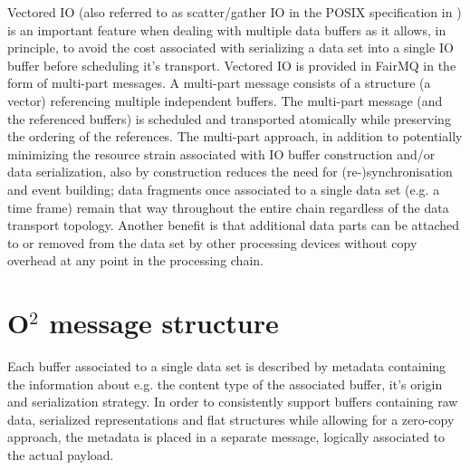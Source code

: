 \documentclass[a4paper,twoside]{article}
\newcommand\comment[1]{\color{red}{ #1 }\color{black}}
\def\O2{O$^2$}
\begin{document}
Vectored IO (also referred to as scatter/gather IO in the POSIX specification in \cite{posix}) is an important feature when dealing with multiple data buffers as it allows, in principle, to avoid the cost associated with serializing a data set into a single IO buffer before scheduling it's transport.
Vectored IO is provided in FairMQ in the form of multi-part messages. A multi-part message consists of a structure (a vector) referencing multiple independent buffers. The multi-part message (and the referenced buffers) is scheduled and transported atomically while preserving the ordering of the references.
The multi-part approach, in addition to potentially minimizing the resource strain associated with IO buffer construction and/or data serialization, also by construction reduces the need for (re-)synchronisation and event building; data fragments once associated to a single data set (e.g. a time frame) remain that way throughout the entire chain regardless of the data transport topology. Another benefit is that additional data parts can be attached to or removed from the data set by other processing devices without copy overhead at any point in the processing chain.

\comment{
In the case zero-copy vectored IO is not supported by the transport layer, compromises have to be made. One possibility is to construct a single message by serializing the contents of all the associated buffers into a single message buffer, this step can be performed transparently to the application.

Another option, if a zero-copy approach is needed, is to prevent the queues from multiplexing and load balancing messages to/from different endpoints by requiring socket-like point-to-point topologies; this, however, introduces a dependency of the data model on runtime configuration and excludes most of the high level features provided by current FairMQ backends, most notably the messaging patterns. Other options may of course exist.
}

\section{\O2 message structure}

Each buffer associated to a single data set is described by metadata containing the information about e.g. the content type of the associated buffer, it's origin and serialization strategy. In order to consistently support buffers containing raw data, serialized representations and flat structures while allowing for a zero-copy approach, the metadata is placed in a separate message, logically associated to the actual payload.
\end{document}
